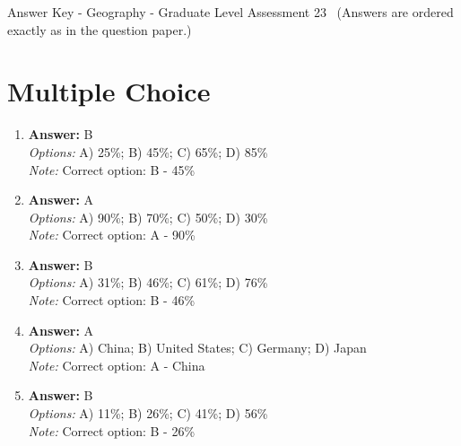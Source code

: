 \documentclass[12pt]{article}
\begin{document}
\begin{center}
Answer Key - Geography - Graduate Level Assessment 23 \
\small (Answers are ordered exactly as in the question paper.)
\end{center}

\section*{Multiple Choice}
\begin{enumerate}[label=\arabic*.]
\item \textbf{Answer:} B
\\ \textit{Options:} A) 25\%; B) 45\%; C) 65\%; D) 85\%
\\ \textit{Note:} Correct option: B - 45\%
\item \textbf{Answer:} A
\\ \textit{Options:} A) 90\%; B) 70\%; C) 50\%; D) 30\%
\\ \textit{Note:} Correct option: A - 90\%
\item \textbf{Answer:} B
\\ \textit{Options:} A) 31\%; B) 46\%; C) 61\%; D) 76\%
\\ \textit{Note:} Correct option: B - 46\%
\item \textbf{Answer:} A
\\ \textit{Options:} A) China; B) United States; C) Germany; D) Japan
\\ \textit{Note:} Correct option: A - China
\item \textbf{Answer:} B
\\ \textit{Options:} A) 11\%; B) 26\%; C) 41\%; D) 56\%
\\ \textit{Note:} Correct option: B - 26\%
\end{enumerate}
\end{document}
